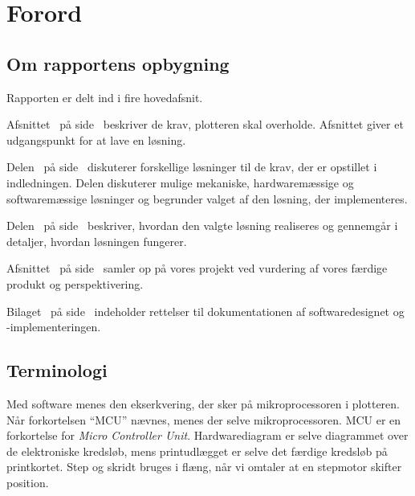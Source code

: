 \chapter{Forord}

\section{Om rapportens opbygning}

Rapporten er delt ind i fire hovedafsnit.

Afsnittet~ på side~\pageref{ch:indledning}
beskriver de krav, plotteren skal overholde. Afsnittet giver et
udgangspunkt for at lave en løsning.

Delen~ på side~\pageref{prt:design} diskuterer
forskellige løsninger til de krav, der er opstillet i
indledningen. Delen diskuterer mulige mekaniske, hardwaremæssige og
softwaremæssige løsninger og begrunder valget af den løsning, der
implementeres.

Delen~ på
side~\pageref{prt:implementering} beskriver, hvordan den valgte
løsning realiseres og gennemgår i detaljer, hvordan løsningen
fungerer.

Afsnittet~ på side~\pageref{ch:afslutning}
samler op på vores projekt ved vurdering af vores færdige produkt og
perspektivering.

Bilaget~ på
side~\pageref{ch:bilag-rettelser-software} indeholder rettelser til
dokumentationen af softwaredesignet og -implementeringen.


\section{Terminologi}


Med software menes den ekserkvering, der sker på mikroprocessoren i
plotteren. Når forkortelsen \enquote{MCU} nævnes, menes der selve
mikroprocessoren. MCU er en forkortelse for \textit{Micro Controller
  Unit}. Hardwarediagram er selve diagrammet over de elektroniske
kredsløb, mens printudlægget er selve det færdige kredsløb på
printkortet. Step og skridt bruges i flæng, når vi omtaler at en
stepmotor skifter position.

